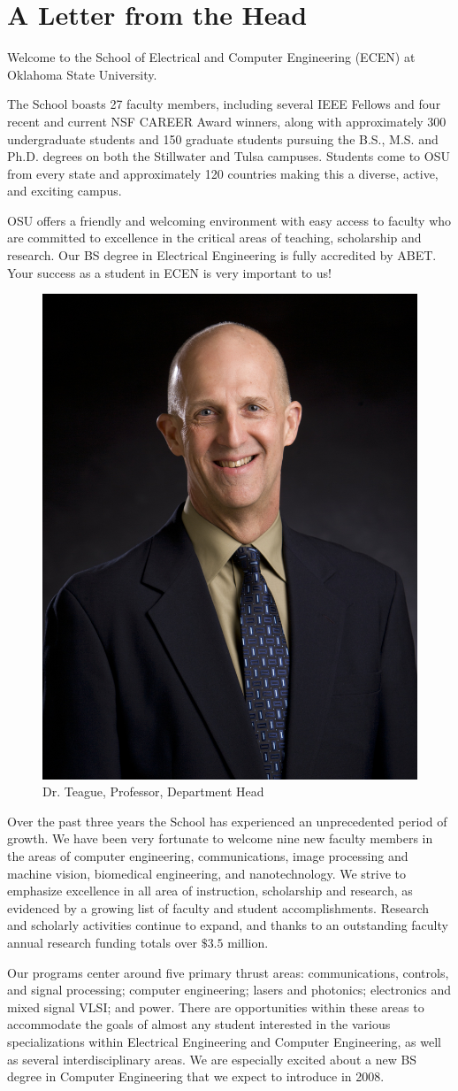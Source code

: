 \section{A Letter from the Head}
Welcome to the School of Electrical and Computer Engineering (ECEN) at Oklahoma State University.

The School boasts 27 faculty members, including several IEEE Fellows and four recent and current NSF CAREER Award winners, along with approximately 300 undergraduate students and 150 graduate students pursuing the B.S., M.S. and Ph.D. degrees on both the Stillwater and Tulsa campuses. Students come to OSU from every state and approximately 120 countries making this a diverse, active, and exciting campus.

OSU offers a friendly and welcoming environment with easy access to faculty who are committed to excellence in the critical areas of teaching, scholarship and research. Our BS degree in Electrical Engineering is fully accredited by ABET. Your success as a student in ECEN is very important to us!

\begin{figure}
    \centering
    \includegraphics[width=0.25\columnwidth]{figs/DrTeague.jpg}
    \caption[Dr. Teague's Head]{Dr. Teague, Professor, Department Head}
\end{figure}
    

Over the past three years the School has experienced an unprecedented period of growth. We have been very fortunate to welcome nine new faculty members in the areas of computer engineering, communications, image processing and machine vision, biomedical engineering, and nanotechnology. We strive to emphasize excellence in all area of instruction, scholarship and research, as evidenced by a growing list of faculty and student accomplishments. Research and scholarly activities continue to expand, and thanks to an outstanding faculty annual research funding totals over $\$3.5$ million.

Our programs center around five primary thrust areas: communications, controls, and signal processing; computer engineering; lasers and photonics; electronics and mixed signal VLSI; and power. There are opportunities within these areas to accommodate the goals of almost any student interested in the various specializations within Electrical Engineering and Computer Engineering, as well as several interdisciplinary areas. We are especially excited about a new BS degree in Computer Engineering that we expect to introduce in 2008.

